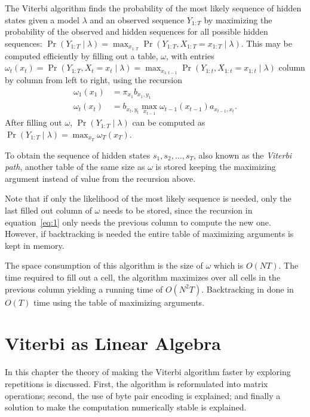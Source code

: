 The Viterbi algorithm finds the probability of the most likely sequence of
hidden states given a model $\lambda$ and an observed sequence $Y_{1:T}$ by
maximizing the probability of the observed and hidden sequences for all
possible hidden sequences: $\Pr(Y_{1:T} \mid \lambda) = \max_{x_{1:T}}
\Pr(Y_{1:T}, X_{1:T} = x_{1:T} \mid \lambda)$. This may be computed efficiently
by filling out a table, $\omega$, with entries $\omega_t(x_t) = \Pr(Y_{1:T},
X_t = x_t \mid \lambda) = \max_{x_{1:t-1}} \Pr(Y_{1:t}, X_{1:t} = x_{1:t} \mid
\lambda)$ column by column from left to right, using the recursion
\begin{align}
  \label{eq:1}
  \omega_1(x_1) &= \pi_{x_1} b_{x_1, y_1} \\
  \omega_t(x_t) &= b_{x_t, y_t} \max_{x_{t - 1}} \omega_{t - 1}(x_{t - 1})
                  a_{x_{t - 1}, x_t}.
\end{align}
After filling out $\omega$, $\Pr(Y_{1:T} \mid \lambda)$ can be computed as
$\Pr(Y_{1:T} \mid \lambda) = \max_{x_T} \omega_T(x_T)$.

To obtain the sequence of hidden states $s_1, s_2, \dots, s_T$, also known as
the \emph{Viterbi path}, another table of the same size as $\omega$ is stored
keeping the maximizing argument instead of value from the recursion above.

Note that if only the likelihood of the most likely sequence is needed, only
the last filled out column of $\omega$ needs to be stored, since the recursion
in equation~\eqref{eq:1} only needs the previous column to compute the new
one. However, if backtracking is needed the entire table of maximizing
arguments is kept in memory. 

The space consumption of this algorithm is the size of $\omega$ which is $O(N
T)$. The time required to fill out a cell, the algorithm maximizes over all
cells in the previous column yielding a running time of $O(N^2
T)$. Backtracking in done in $O(T)$ time using the table of maximizing
arguments.

\section{Viterbi as Linear Algebra}
\label{sec:algorithm-as-linear}

In this chapter the theory of making the Viterbi algorithm faster by exploring
repetitions is discussed. First, the algorithm is reformulated into matrix
operations; second, the use of byte pair encoding is explained; and finally
a solution to make the computation numerically stable is explained.

